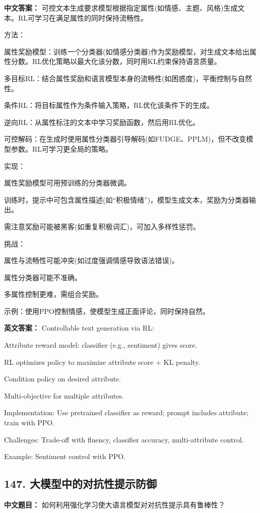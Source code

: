 \documentclass[10pt,a4paper]{ctexart}
\begin{document}
\textbf{中文答案：}
可控文本生成要求模型根据指定属性(如情感、主题、风格)生成文本。RL可学习在满足属性的同时保持流畅性。

方法：

属性奖励模型：训练一个分类器(如情感分类器)作为奖励模型，对生成文本给出属性分数。RL优化策略以最大化该分数，同时用KL约束保持语言质量。

多目标RL：结合属性奖励和语言模型本身的流畅性(如困惑度)，平衡控制与自然性。

条件RL：将目标属性作为条件输入策略，RL优化该条件下的生成。

逆向RL：从属性标注的文本中学习奖励函数，然后用RL优化。

可控解码：在生成时使用属性分类器引导解码(如FUDGE、PPLM)，但不改变模型参数。RL可学习更全局的策略。

实现：

属性奖励模型可用预训练的分类器微调。

训练时，提示中可包含属性描述(如“积极情绪”)，模型生成文本，奖励为分类器输出。

需注意奖励可能被黑客(如重复积极词汇)，可加入多样性惩罚。

挑战：

属性与流畅性可能冲突(如过度强调情感导致语法错误)。

属性分类器可能不准确。

多属性控制更难，需组合奖励。

示例：使用PPO控制情感，使模型生成正面评论，同时保持自然。

\textbf{英文答案：}
Controllable text generation via RL:

Attribute reward model: classifier (e.g., sentiment) gives score.

RL optimizes policy to maximize attribute score + KL penalty.

Condition policy on desired attribute.

Multi-objective for multiple attributes.

Implementation: Use pretrained classifier as reward; prompt includes attribute; train with PPO.

Challenges: Trade-off with fluency, classifier accuracy, multi-attribute control.

Example: Sentiment control with PPO.

\subsection*{147. 大模型中的对抗性提示防御}
\textbf{中文题目：} 如何利用强化学习使大语言模型对对抗性提示具有鲁棒性？
\end{document}

